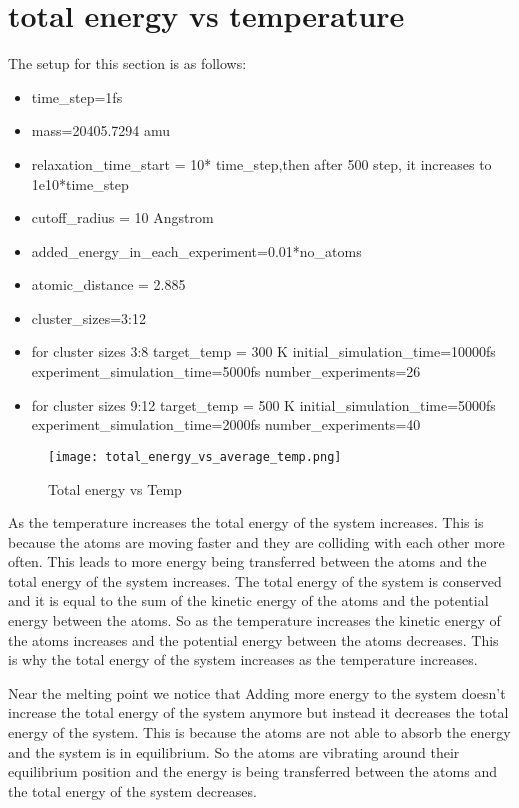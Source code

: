 \section{total energy vs temperature}
The setup for this section is as follows:
    \begin{itemize}
        \item time\_step=1fs
        \item mass=20405.7294 amu
        \item relaxation\_time\_start = 10* time\_step,then after 500 step, it increases to 1e10*time\_step
        \item cutoff\_radius = 10 Angstrom
        \item added\_energy\_in\_each\_experiment=0.01*no\_atoms
        \item atomic\_distance = 2.885
        \item cluster\_sizes=3:12
        \item for cluster sizes 3:8 
        \subitem  target\_temp = 300 K
        \subitem  initial\_simulation\_time=10000fs
        \subitem  experiment\_simulation\_time=5000fs
        \subitem  number\_experiments=26
        \item for cluster sizes 9:12 
        \subitem  target\_temp = 500 K
        \subitem  initial\_simulation\_time=5000fs
        \subitem  experiment\_simulation\_time=2000fs
        \subitem  number\_experiments=40
    \end{itemize}
    \graphicspath{ {./figures/milestone07/} }
    \begin{figure}[!htb]
    \centering
        \texttt{[image: total\_energy\_vs\_average\_temp.png]}
        \caption{Total energy vs Temp}
    \label{fig:simulation_time_vs_atoms_number}
    \end{figure}
    As the temperature increases the total energy of the system increases. This is because the atoms are moving faster and they are colliding with each other more often. This leads to more energy being transferred between the atoms and the total energy of the system increases. The total energy of the system is conserved and it is equal to the sum of the kinetic energy of the atoms and the potential energy between the atoms. So as the temperature increases the kinetic energy of the atoms increases and the potential energy between the atoms decreases. This is why the total energy of the system increases as the temperature increases.  

    Near the melting point we notice that Adding more energy to the system doesn't increase the total energy of the system anymore but instead it decreases the total energy of the system. This is because the atoms are not able to absorb the energy and the system is in equilibrium. So the atoms are vibrating around their equilibrium position and the energy is being transferred between the atoms and the total energy of the system decreases.

